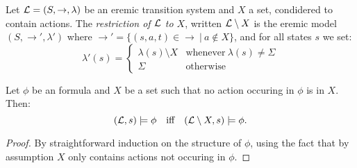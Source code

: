 


\begin{definition}
Let $\mathcal{L} = (S, \rightarrow, \lambda)$ be an eremic transition system
and $X$ a set, condidered to contain actions. The \emph{restriction of
  $\mathcal{L}$ to $X$}, written $\mathcal{L} \setminus X$ is the eremic model $(S,
\rightarrow', \lambda')$ where $\rightarrow' = \{(s, a, t) \in
\rightarrow \ |\ a \notin X\}$, and for all states $s$ we set:
\[
   \lambda'(s) 
        =
   \begin{cases}
       \lambda(s) \setminus  X & \text{whenever}\ \lambda(s) \neq \Sigma \\
       \Sigma & \text{otherwise}
   \end{cases}
\]

\end{definition}

\begin{lemma}\label{compactness:lemma:1717}
Let $\phi$ be an \ELABR{} formula and $X$ be a set such that no action
occuring in $\phi$ is in $X$. Then:
\[
   (\mathcal{L}, s) \models \phi
      \quad\text{iff}\quad
   (\mathcal{L} \setminus X, s) \models \phi.
\]
\end{lemma}
\begin{proof}
By straightforward induction on the structure of $\phi$, using the
fact that by assumption $X$ only contains actions not occuring in
$\phi$.  
\end{proof}

